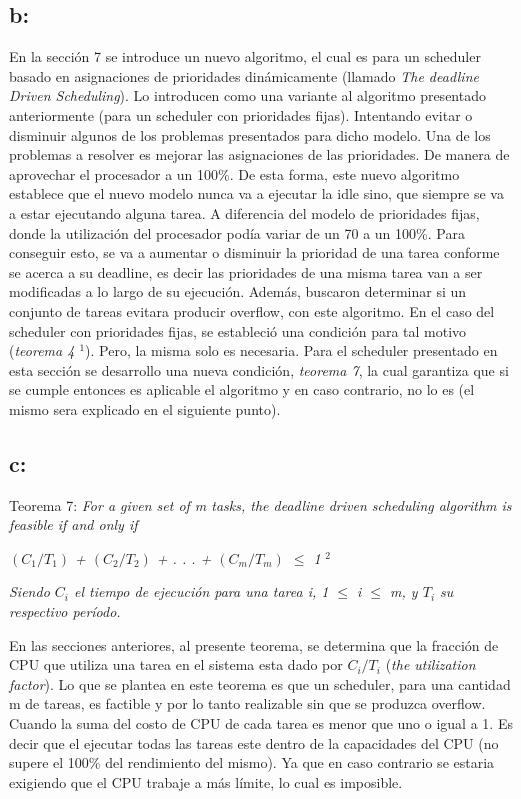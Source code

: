 \documentclass[a4paper]{article}
\begin{document}
\subsection{b:}
En la sección 7 se introduce un nuevo algoritmo, el cual es para un scheduler basado en asignaciones de prioridades dinámicamente (llamado \textit{The deadline Driven Scheduling}). Lo introducen como una variante al algoritmo presentado anteriormente (para un scheduler con prioridades fijas). Intentando evitar o disminuir algunos de los problemas presentados para dicho modelo. \newline
Una de los problemas a resolver es mejorar las asignaciones de las prioridades. De manera de aprovechar el procesador a un 100\%. De esta forma, este nuevo algoritmo establece que el nuevo modelo nunca va a ejecutar la idle sino, que siempre se va a estar ejecutando alguna tarea. A diferencia del modelo de prioridades fijas, donde la utilización del procesador podía variar de un 70 a un 100\%. Para conseguir esto, se va a aumentar o disminuir la prioridad de una tarea conforme se acerca a su deadline, es decir las prioridades de una misma tarea van a ser modificadas a lo largo de su ejecución. Además, buscaron determinar si un conjunto de tareas evitara producir overflow, con este algoritmo. En el caso del scheduler con prioridades fijas, se estableció una condición para tal motivo (\textit{teorema 4 $^1$}). Pero, la misma solo es necesaria. Para el scheduler presentado en esta sección se desarrollo una nueva condición, \textit{teorema 7}, la cual garantiza que si se cumple entonces es aplicable el algoritmo y en caso contrario, no lo es (el mismo sera explicado en el siguiente punto). 
  
\subsection{c:}

Teorema 7:
\textit {For a given set of m tasks, the deadline driven scheduling algorithm
is feasible if and only if }\newline
 
 \textit {$(C_1/T_1)$ + $(C_2/T_2)$ + . . . + $(C_m/T_m)$ $\leq$ 1 } $^2$\newline

\textit{Siendo $C_i$ el tiempo de ejecuci\'on para una tarea i, 1 $\leq$ i $\leq$ m, y $T_i$ su respectivo per\'iodo.}

En las secciones anteriores, al presente teorema, se determina que la fracción de CPU que utiliza una tarea en el sistema esta dado por $C_i/T_i$ (\textit{the utilization factor}). Lo que se plantea en este teorema es que un scheduler, para una cantidad m de tareas, es factible y por lo tanto realizable sin que se produzca overflow. Cuando la suma del costo de CPU de cada tarea es menor que uno o igual a 1. Es decir que el ejecutar todas las tareas este dentro de la capacidades del CPU (no supere el 100\% del rendimiento del mismo). Ya que en caso contrario se estaria exigiendo que el CPU trabaje a más límite, lo cual es imposible. \newline
\end{document}
